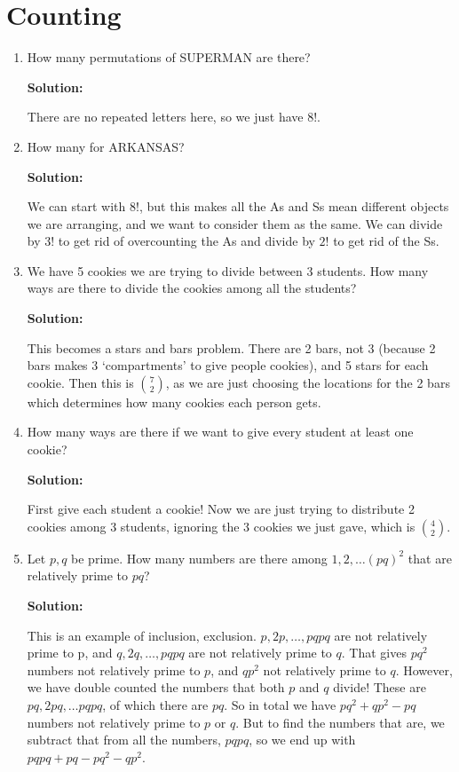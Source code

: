 \documentclass{article}
\newenvironment{solution}{

        \color{blue} \smallskip \textbf{Solution:}

    }{}
\begin{document}
\section{Counting}
\begin{enumerate}
    \item How many permutations of SUPERMAN are there?
    \begin{solution}
        There are no repeated letters here, so we just have $8!$.
    \end{solution}
    \item How many for ARKANSAS?
    \begin{solution}
        We can start with $8!$, but this makes all the As and Ss mean different objects we are arranging, and we want to consider
        them as the same. We can divide by $3!$ to get rid of
        overcounting the As and divide by $2!$ to get rid of the Ss.
    \end{solution}
    \item We have 5 cookies we are trying to divide between 3 students. How many ways are there to divide the cookies among all the students?
    \begin{solution}
    This becomes a stars and bars problem. There are 2 bars, not 3 (because 2 bars makes 3 `compartments' to give people cookies), and 5 stars for each
    cookie. Then this is ${7 \choose 2}$, as we are just choosing the locations for the 2 bars which determines how many cookies each person gets.
    \end{solution}
    \item How many ways are there if we want to give every student at least one cookie?
    \begin{solution}
    First give each student a cookie! Now we are just trying to distribute 2 cookies among 3 students, ignoring the 3 cookies we just gave,
    which is ${4 \choose 2}$.
    \end{solution}

    \item Let $p, q$ be prime. How many numbers are there among $1, 2, \ldots (pq)^2$ that are relatively prime to $pq$?
    \begin{solution}
    This is an example of inclusion, exclusion. $p, 2p, \ldots, pqpq$ are not relatively prime to p, and $q, 2q, \ldots, pqpq$ are not relatively
    prime to $q$. That gives $pq^2$ numbers not relatively prime to $p$, and $qp^2$ not relatively prime to $q$. However, we have double counted the
    numbers that both $p$ and $q$ divide! These are $pq, 2pq, \ldots pqpq$, of which there are $pq$. So in total we have $pq^2 + qp^2 - pq$ numbers not
    relatively prime to $p$ or $q$. But to find the numbers that are, we subtract that from all the numbers, $pqpq$, so we end up with
    $pqpq + pq - pq^2 - qp^2$.
    \end{solution}


\end{enumerate}
\end{document}
